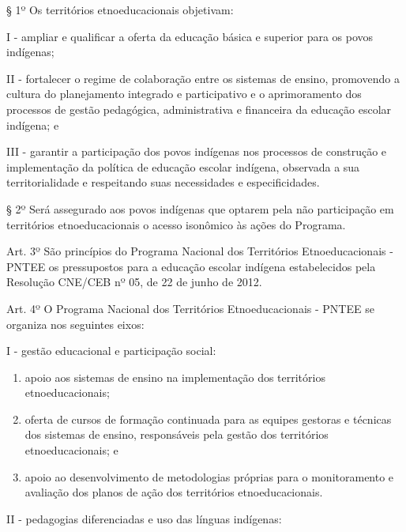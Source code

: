 \documentclass[
]{book}
\begin{document}
§ 1º Os territórios etnoeducacionais objetivam:

I - ampliar e qualificar a oferta da educação básica e superior para os povos indígenas;

II - fortalecer o regime de colaboração entre os sistemas de ensino, promovendo a cultura do planejamento integrado e participativo e o aprimoramento dos processos de gestão pedagógica, administrativa e financeira da educação escolar indígena; e

III - garantir a participação dos povos indígenas nos processos de construção e implementação da política de educação escolar indígena, observada a sua territorialidade e respeitando suas necessidades e especificidades.

§ 2º Será assegurado aos povos indígenas que optarem pela não participação em territórios etnoeducacionais o acesso isonômico às ações do Programa.

Art. 3º São princípios do Programa Nacional dos Territórios Etnoeducacionais - PNTEE os pressupostos para a educação escolar indígena estabelecidos pela Resolução CNE/CEB nº 05, de 22 de junho de 2012.

Art. 4º O Programa Nacional dos Territórios Etnoeducacionais - PNTEE se organiza nos seguintes eixos:

I - gestão educacional e participação social:

\begin{enumerate}
\def\labelenumi{\alph{enumi})}
\item
  apoio aos sistemas de ensino na implementação dos territórios etnoeducacionais;
\item
  oferta de cursos de formação continuada para as equipes gestoras e técnicas dos sistemas de ensino, responsáveis pela gestão dos territórios etnoeducacionais; e
\item
  apoio ao desenvolvimento de metodologias próprias para o monitoramento e avaliação dos planos de ação dos territórios etnoeducacionais.
\end{enumerate}

II - pedagogias diferenciadas e uso das línguas indígenas:
\end{document}

